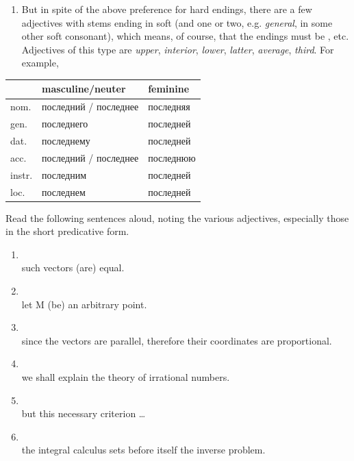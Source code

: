 \begin{enumerate}[label=\roman*)]
\item But in spite of the above preference for hard endings, there are a few adjectives with stems ending in soft  (and one or two, e.g.  \emph{general}, in some other soft consonant), which means, of course, that the endings must be , etc. Adjectives of this type are  \emph{upper},  \emph{interior},  \emph{lower},  \emph{latter},  \emph{average},  \emph{third}. For example,
\end{enumerate}

\begin{center}
\small
\begin{tabular}{@{}l >{\cyrillicfont}l >{\cyrillicfont}l@{}}
\toprule
& masculine/neuter & feminine\\
\midrule
nom. & последний / последнее & последняя\\
gen. & последнего & последней\\
dat. & последнему & последней\\
acc. & последний / последнее & последнюю\\
instr. & последним & последней\\
loc. & последнем & последней\\
\bottomrule
\end{tabular}
\end{center}

\begin{keybox}[Exercise 3.3]
Read the following sentences aloud, noting the various adjectives, especially those in the short predicative form.
\end{keybox}

\begin{enumerate}[label=\arabic*)]
\item {}\\
      such vectors (are) equal.
\item {}\\
      let M (be) an arbitrary point.
\item {}\\
      since the vectors are parallel, therefore their coordinates are proportional.
\item {}\\
      we shall explain the theory of irrational numbers.
\item {}\\
      but this necessary criterion \ldots
\item {}\\
      the integral calculus sets before itself the inverse problem.
\end{enumerate}


